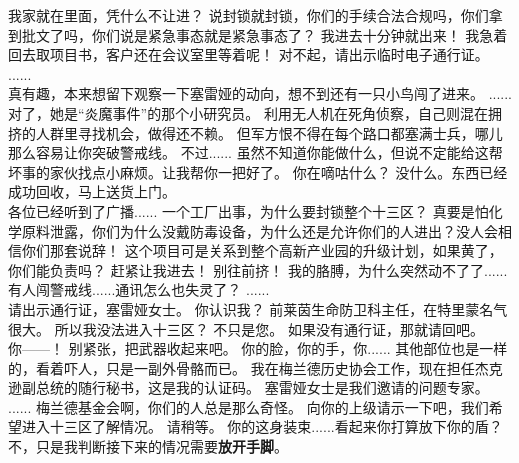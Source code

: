 \documentclass[openany]{book}
\begin{document}
\begin{dialogue}
     我家就在里面，凭什么不让进？
     说封锁就封锁，你们的手续合法合规吗，你们拿到批文了吗，你们说是紧急事态就是紧急事态了？
     我进去十分钟就出来！
     我急着回去取项目书，客户还在会议室里等着呢！
     对不起，请出示临时电子通行证。
     ......
    \\
     真有趣，本来想留下观察一下塞雷娅的动向，想不到还有一只小鸟闯了进来。
     ......对了，她是“炎魔事件”的那个小研究员。
     利用无人机在死角侦察，自己则混在拥挤的人群里寻找机会，做得还不赖。
     但军方恨不得在每个路口都塞满士兵，哪儿那么容易让你突破警戒线。
     不过......
     虽然不知道你能做什么，但说不定能给这帮坏事的家伙找点小麻烦。让我帮你一把好了。
     你在嘀咕什么？
     没什么。东西已经成功回收，马上送货上门。
    \\
     各位已经听到了广播......
     一个工厂出事，为什么要封锁整个十三区？
     真要是怕化学原料泄露，你们为什么没戴防毒设备，为什么还是允许你们的人进出？没人会相信你们那套说辞！
     这个项目可是关系到整个高新产业园的升级计划，如果黄了，你们能负责吗？
     赶紧让我进去！
     别往前挤！
     我的胳膊，为什么突然动不了了......
     有人闯警戒线......通讯怎么也失灵了？
     ......
    \\
     请出示通行证，塞雷娅女士。
     你认识我？
     前莱茵生命防卫科主任，在特里蒙名气很大。
     所以我没法进入十三区？
     不只是您。
     如果没有通行证，那就请回吧。
    \\
     你——！
     别紧张，把武器收起来吧。
     你的脸，你的手，你......
     其他部位也是一样的，看着吓人，只是一副外骨骼而已。
     我在梅兰德历史协会工作，现在担任杰克逊副总统的随行秘书，这是我的认证码。
     塞雷娅女士是我们邀请的问题专家。
     ......
     梅兰德基金会啊，你们的人总是那么奇怪。
     向你的上级请示一下吧，我们希望进入十三区了解情况。
     请稍等。
     你的这身装束......看起来你打算放下你的盾？
     不，只是我判断接下来的情况需要\textbf{放开手脚}。

\end{dialogue}
\end{document}
